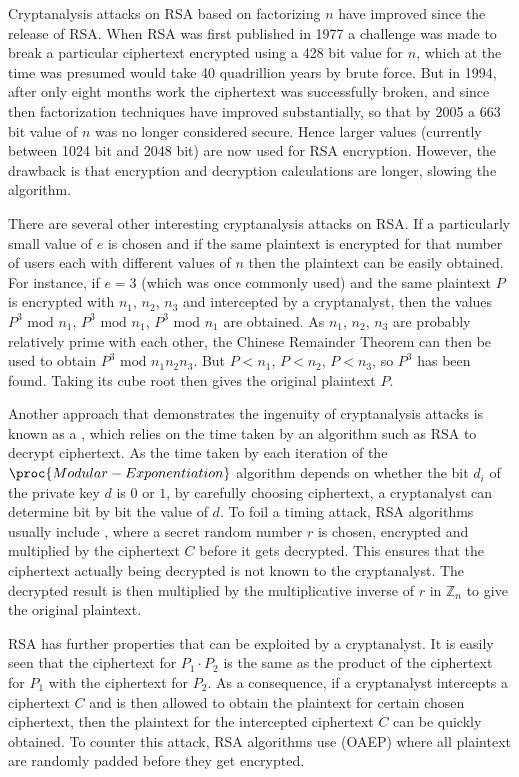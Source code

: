 Cryptanalysis attacks on RSA based on factorizing $n$ have improved since the
release of RSA. When RSA was first published in 1977 a challenge was made
to break a particular ciphertext encrypted using a 428 bit value for $n$,
which at the time was presumed would take 40 quadrillion years by brute force.
But in 1994, after only eight months work the ciphertext was successfully
broken, and since then factorization techniques have improved substantially,
so that by 2005 a 663 bit value of $n$ was no longer considered secure.
Hence larger values (currently between 1024 bit and 2048 bit) are now used for
RSA encryption. However, the drawback is that encryption and decryption
calculations are longer, slowing the algorithm.

There are several other interesting cryptanalysis attacks on RSA.
If a particularly small value of $e$ is chosen and if the same plaintext is encrypted
for that number of users each with different values of $n$ then the plaintext
can be easily obtained. For instance, if $e=3$ (which was once commonly used)
and the same plaintext $P$ is encrypted with $n_1$, $n_2$, $n_3$ and intercepted by a
cryptanalyst, then the values
$P^3\mbox{ mod }n_1$, $P^3\mbox{ mod }n_1$, $P^3\mbox{ mod }n_1$
are obtained. As $n_1$, $n_2$, $n_3$ are probably relatively prime
with each other, the Chinese Remainder Theorem can then be used to obtain
$P^3\mbox{ mod }n_1n_2n_3$. But $P<n_1$, $P<n_2$, $P<n_3$, so $P^3$
has been found. Taking its cube root then gives the original plaintext $P$.

Another approach that demonstrates the ingenuity of cryptanalysis attacks
is known as a , which relies on the time taken by an
algorithm such as RSA to decrypt ciphertext.
As the time taken by each iteration of the $\proc{Modular-Exponentiation}$
algorithm depends on whether the bit $d_i$ of the private key $d$ is $0$
or $1$, by carefully choosing ciphertext, a cryptanalyst can
determine bit by bit the value of $d$. To foil a timing attack,
RSA algorithms usually include , where a secret random number
$r$ is chosen, encrypted and multiplied by the ciphertext $C$ before it
gets decrypted. This ensures that the ciphertext actually being decrypted is not
known to the cryptanalyst. The decrypted result is then multiplied by
the multiplicative inverse of $r$ in $\mathbb{Z}_n$ to give the original
plaintext.

RSA has further properties that can be exploited by a cryptanalyst.
It is easily seen that the ciphertext for $P_1\cdot P_2$ is the same
as the product of the ciphertext for $P_1$ with the ciphertext for $P_2$.
As a consequence, if a cryptanalyst intercepts a ciphertext $C$ and
is then allowed to obtain the plaintext for certain chosen ciphertext, then
the plaintext for the intercepted ciphertext $C$ can be quickly obtained.
To counter this attack, RSA algorithms use 
(OAEP) where all plaintext are randomly padded before they get encrypted.


